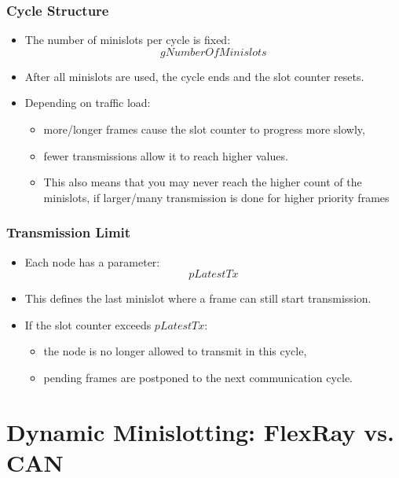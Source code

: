 \subsubsection*{Cycle Structure}

\begin{itemize}
    \item The number of minislots per cycle is fixed:
    \[
    gNumberOfMinislots
    \]
    
    \item After all minislots are used, the cycle ends and the slot counter resets.
    
    \item Depending on traffic load:
    \begin{itemize}
        \item more/longer frames cause the slot counter to progress more slowly,
        \item fewer transmissions allow it to reach higher values.
        \item This also means that you may never reach the higher count of the minislots, if larger/many transmission is done for higher priority frames
    \end{itemize}
\end{itemize}

\subsubsection*{Transmission Limit}

\begin{itemize}
    \item Each node has a parameter:
    \[
    pLatestTx
    \]
    
    \item This defines the last minislot where a frame can still start transmission.
    
    \item If the slot counter exceeds $pLatestTx$:
    \begin{itemize}
        \item the node is no longer allowed to transmit in this cycle,
        \item pending frames are postponed to the next communication cycle.
    \end{itemize}
\end{itemize}

\section{Dynamic Minislotting: FlexRay vs. CAN}

